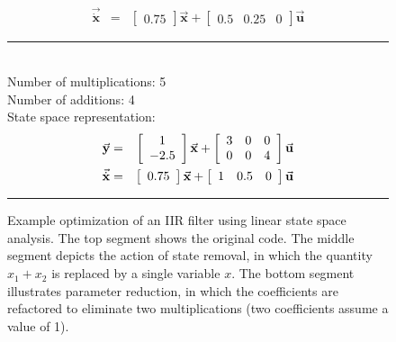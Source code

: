 \begin{figure}[t!]
\begin{singlespace}
{\begin{minipage}{3.5in}
\begin{eqnarray*}
\vec{\dot{\mathbf{x}}} & = & \left [ \begin{array} {cc} 0.75
\end{array} \right ] \vec{\mathbf{x}} + \left [ \begin{array} {ccc} 0.5 & 0.25 & 0 \end{array} \right ] \vec{\mathbf{u}}
\end{eqnarray*}
\hrule
\vspace{12pt} ~ \\
{\small
Number of multiplications: 5 \\
Number of additions: 4 \\
State space representation:}
\begin{eqnarray*}
\small
\vec{\mathbf{y}} & = & \left [ \begin{array} {cc} 1 \\ -2.5
\end{array} \right ] \vec{\mathbf{x}} + \left [ \begin{array} {ccc} 3 & 0 & 0 \\ 0 & 0 & 4 \end{array} \right
 ] \vec{\mathbf{u}} \\
\vec{\dot{\mathbf{x}}} & = & \left [ \begin{array} {cc} 0.75
\end{array} \right ] \vec{\mathbf{x}} + \left [ \begin{array} {ccc} 1 & 0.5 & 0 \end{array} \right ] \vec{\mathbf{u}}
\end{eqnarray*}
\end{minipage}}
\end{singlespace}
\begin{center}
\vspace{-24pt}
\caption{Example optimization of an IIR filter using linear state
space analysis.  The top segment shows the original code.  The middle
segment depicts the action of state removal, in which the quantity
$x_1 + x_2$ is replaced by a single variable $x$.  The bottom segment
illustrates parameter reduction, in which the coefficients are
refactored to eliminate two multiplications (two coefficients
assume a value of 1).\protect\label{fig:opt-seq}}
\end{center}
\vspace{-18pt}
\hrule
\vspace{-12pt}
\end{figure}
